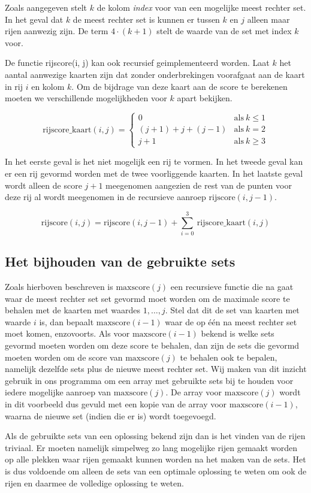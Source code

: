 \documentclass{article}
\begin{document}
Zoals aangegeven stelt $k$ de kolom \emph{index} voor van een mogelijke meest rechter set. In het geval dat $k$ de meest rechter set is kunnen er tussen $k$ en $j$ alleen maar rijen aanwezig zijn. De term $4 \cdot (k + 1)$ stelt de waarde van de set met index $k$ voor. 

De functie rijscore(i, j) kan ook recursief geimplementeerd worden. Laat $k$ het aantal aanwezige kaarten zijn dat zonder onderbrekingen voorafgaat aan de kaart in rij $i$ en kolom $k$. Om de bijdrage van deze kaart aan de score te berekenen moeten we verschillende mogelijkheden voor $k$ apart bekijken.

$$
\text{rijscore\_kaart}(i, j) = \begin{cases}
    0 & \text{als} \ k \le 1 \\
    (j + 1) + j + (j - 1) & \text{als} \  k = 2 \\
    j + 1 & \text{als} \  k \ge 3
\end{cases}
$$

In het eerste geval is het niet mogelijk een rij te vormen. In het tweede geval kan er een rij gevormd worden met de twee voorliggende kaarten. In het laatste geval wordt alleen de score $j + 1$ meegenomen aangezien de rest van de punten voor deze rij al wordt meegenomen in de recursieve aanroep $\text{rijscore}(i, j - 1)$.

$$
\text{rijscore}(i, j) = \text{rijscore}(i, j - 1) + \sum_{i = 0}^{3} \  \text{rijscore\_kaart}(i, j)
$$

\subsection{Het bijhouden van de gebruikte sets}

Zoals hierboven beschreven is $\text{maxscore}(j)$ een recursieve functie die na gaat waar de meest rechter set set gevormd moet worden om de maximale score te behalen met de kaarten met waardes $1, \ldots, j$. Stel dat dit de set van kaarten met waarde $i$ is, dan bepaalt $\text{maxscore}(i - 1)$ waar de op één na meest rechter set moet komen, enzovoorts.
Als voor $\text{maxscore}(i - 1)$ bekend is welke sets gevormd moeten worden om deze score te behalen, dan zijn de sets die gevormd moeten worden om de score van $\text{maxscore}(j)$ te behalen ook te bepalen, namelijk dezelfde sets plus de nieuwe meest rechter set. Wij maken van dit inzicht gebruik in ons programma om een array met gebruikte sets bij te houden voor iedere mogelijke aanroep van $\text{maxscore}(j)$. De array voor $\text{maxscore}(j)$ wordt in dit voorbeeld dus gevuld met een kopie van de array voor $\text{maxscore}(i - 1)$, waarna de nieuwe set (indien die er is) wordt toegevoegd.
\par Als de gebruikte sets van een oplossing bekend zijn dan is het vinden van de rijen triviaal. Er moeten namelijk simpelweg zo lang mogelijke rijen gemaakt worden op alle plekken waar rijen gemaakt kunnen worden na het maken van de sets. Het is dus voldoende om alleen de sets van een optimale oplossing te weten om ook de rijen en daarmee de volledige oplossing te weten.
\end{document}
